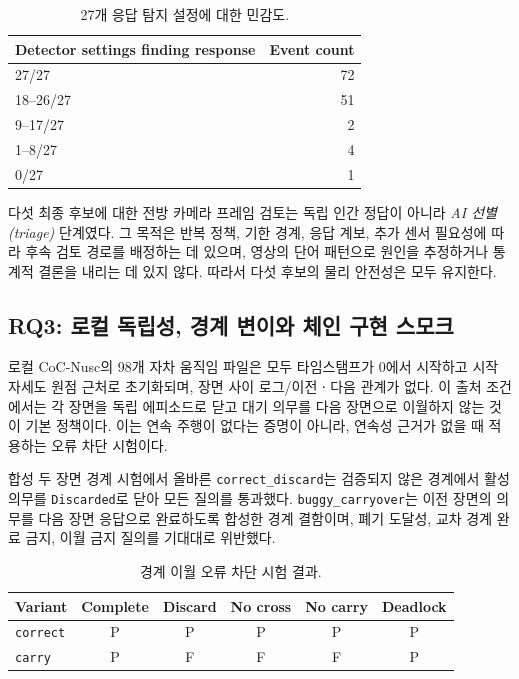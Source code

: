 \begin{table}[t]
\centering
\caption{27개 응답 탐지 설정에 대한 민감도.}
\label{tab:detector-sensitivity}
\footnotesize
\begin{tabular}{lr}
\toprule
Detector settings finding response & Event count \\
\midrule
27/27 & 72 \\
18--26/27 & 51 \\
9--17/27 & 2 \\
1--8/27 & 4 \\
0/27 & 1 \\
\bottomrule
\end{tabular}
\end{table}

다섯 최종 후보에 대한 전방 카메라 프레임 검토는 독립 인간 정답이 아니라 \emph{AI 선별(triage)} 단계였다. 그 목적은 반복 정책, 기한 경계, 응답 계보, 추가 센서 필요성에 따라 후속 검토 경로를 배정하는 데 있으며, 영상의 단어 패턴으로 원인을 추정하거나 통계적 결론을 내리는 데 있지 않다. 따라서 다섯 후보의 물리 안전성은 모두  유지한다.

\subsection{RQ3: 로컬 독립성, 경계 변이와 체인 구현 스모크}
\label{sec:results-rq3}

로컬 CoC-Nusc의 98개 자차 움직임 파일은 모두 타임스탬프가 0에서 시작하고 시작 자세도 원점 근처로 초기화되며, 장면 사이 로그/이전ㆍ다음 관계가 없다. 이 출처 조건에서는 각 장면을 독립 에피소드로 닫고 대기 의무를 다음 장면으로 이월하지 않는 것이 기본 정책이다. 이는 연속 주행이 없다는 증명이 아니라, 연속성 근거가 없을 때 적용하는 오류 차단 시험이다.

합성 두 장면 경계 시험에서 올바른 \texttt{correct\_discard}는 검증되지 않은 경계에서 활성 의무를 \texttt{Discarded}로 닫아 모든 질의를 통과했다. \texttt{buggy\_carryover}는 이전 장면의 의무를 다음 장면 응답으로 완료하도록 합성한 경계 결함이며, 폐기 도달성, 교차 경계 완료 금지, 이월 금지 질의를 기대대로 위반했다.

\begin{table}[t]
\centering
\caption{경계 이월 오류 차단 시험 결과.}
\label{tab:boundary-negative-control}
\scriptsize
\begin{tabular}{lccccc}
\toprule
Variant & Complete & Discard & No cross & No carry & Deadlock \\
\midrule
\texttt{correct} & P & P & P & P & P \\
\texttt{carry} & P & F & F & F & P \\
\bottomrule
\end{tabular}
\end{table}

